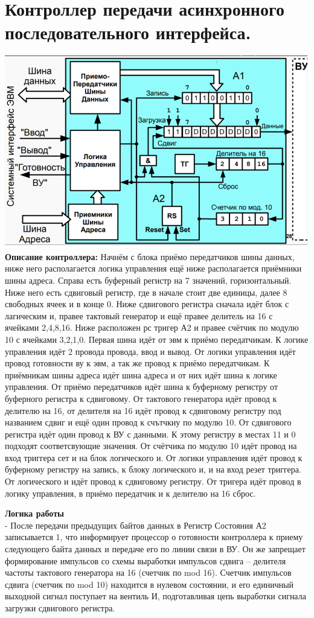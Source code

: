 \documentclass{article}
\begin{document}
\section{Контроллер передачи асинхронного последовательного интерфейса.}
\includegraphics[width=.8\textwidth]{out3.png}\\
\textbf{Описание контроллера:}
Начнём с блока приёмо передатчиков шины данных, ниже него располагается логика управления ещё ниже располагается приёмники шины адреса. Справа есть буферный регистр на 7 значений, горизонтальный. Ниже него есть сдвиговый регистр, где в начале стоит две единицы, далее 8 свободных ячеек и в конце 0. Ниже сдвигового регистра сначала идёт блок с лагическим и, правее тактовый генератор и ещё правее делитель на 16 с ячейками 2,4,8,16. Ниже расположен рс тригер А2 и правее счётчик по модулю 10 с ячейками 3,2,1,0.
Первая шина идёт от эвм к приёмо передатчикам. К логике управления идёт 2 провода провода, ввод и вывод. От логики управления идёт провод готовности ву к эвм, а так же провод к приёмо передатчикам. К приёмникам шины адреса идёт шина адреса и от них идёт шина к логике управления.
От приёмо передатчиков идёт шина к буферному регистру от буферного регистра к сдвиговому. 
От тактового генератора идёт провод к делителю на 16, от делителя на 16 идёт провод к сдвиговому регистру под названием сдвиг и ещё один провод к счътчкиу по модулю 10. От сдвигового регистра идёт один провод к ВУ с данными. К этому регистру в местах 11 и 0 подходят соответсвующие значения.
От счётчика по модулю 10 идёт провод на вход триггера сет и на блок логического и. От логики управления идёт провод к буферному регистру на запись, к блоку логического и, и на вход резет триггера. От логического и идёт провод к сдвиговому регистру. От тригера идёт провод в логику управления, в приёмо передатчик и к делителю на 16 сброс.

\textbf{Логика работы}\\
-	После передачи предыдущих байтов данных в Регистр Состояния А2 записывается 1, что информирует процессор о готовности контроллера к приему следующего байта данных и передаче его по линии связи в ВУ. Он же запрещает формирование импульсов со схемы выработки импульсов сдвига – делителя частоты тактового генератора на 16 (счетчик по mod 16). Счетчик импульсов сдвига (счетчик по mod 10) находится в нулевом состоянии, и его единичный выходной сигнал поступает на вентиль И, подготавливая цепь выработки сигнала загрузки сдвигового регистра. 
\end{document}
